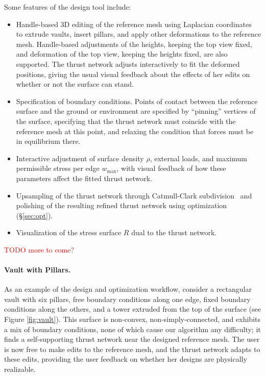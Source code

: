 \documentclass[annual]{acmsiggraph}
\newcommand{\todo}[1]{\textcolor{red}{#1}}
\newcommand{\secref}[1]{(\S\ref{#1})}
\begin{document}
Some features of the design tool include:

\begin{itemize}

\item Handle-based 3D editing of the reference mesh using Laplacian
coordinates~\cite{Lipman2004,Sorkine2003} to extrude vaults, insert
pillars, and apply other deformations to the reference mesh. Handle-based
adjustments of the heights, keeping the top view fixed, and deformation of
the top view, keeping the heights fixed, are also supported. The thrust
network adjusts interactively to fit the deformed positions, giving the
usual visual feedback about the effects of her edits on whether or not the
surface can stand.

\item Specification of boundary conditions. Points of contact between the
reference surface and the ground or environment are specified by
``pinning'' vertices of the surface, specifying that the thrust network
must coincide with the reference mesh at this point, and relaxing the
condition that forces must be in equilibrium there.

\item Interactive adjustment of surface density $\rho$, external loads,
and maximum permissible stress per edge $w_{\textrm{max}}$, with visual
feedback of how these parameters affect the fitted thrust network.

\item Upsampling of the thrust network through Catmull-Clark
subdivision~\cite{TODO} and polishing of the resulting refined thrust
network using optimization \secref{sec:opt}.

\item Visualization of the stress surface $R$ dual to the thrust network.

\end{itemize}

\todo{TODO more to come?}


\paragraph{Vault with Pillars.} As an example of the design and optimization workflow, consider a rectangular vault with six pillars, free boundary conditions along one edge, fixed boundary conditions along the others, and a tower extruded from the top of the surface (see Figure \ref{fig:vault}). This surface is non-convex, non-simply-connected, and exhibits a mix of boundary conditions, none of which cause our algorithm any difficulty; it finds a self-supporting thrust network near the designed reference mesh. The user is now free to make edits to the reference mesh, and the thrust network adapts to these edits, providing the user feedback on whether her designs are physically realizable.
\end{document}
